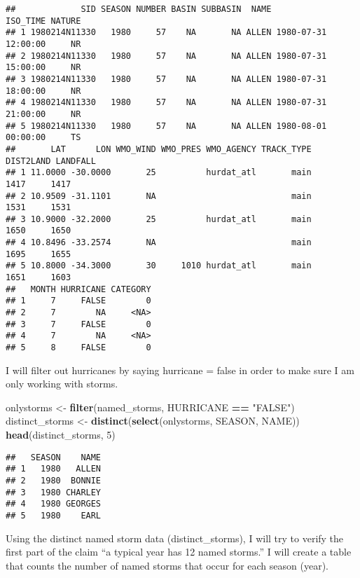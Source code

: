 \documentclass[
]{article}
\newenvironment{Shaded}{\begin{snugshade}}{\end{snugshade}}
\newcommand{\DecValTok}[1]{\textcolor[rgb]{0.00,0.00,0.81}{#1}}
\newcommand{\KeywordTok}[1]{\textcolor[rgb]{0.13,0.29,0.53}{\textbf{#1}}}
\newcommand{\NormalTok}[1]{#1}
\newcommand{\OperatorTok}[1]{\textcolor[rgb]{0.81,0.36,0.00}{\textbf{#1}}}
\newcommand{\StringTok}[1]{\textcolor[rgb]{0.31,0.60,0.02}{#1}}
\begin{document}
\begin{verbatim}
##             SID SEASON NUMBER BASIN SUBBASIN  NAME            ISO_TIME NATURE
## 1 1980214N11330   1980     57    NA       NA ALLEN 1980-07-31 12:00:00     NR
## 2 1980214N11330   1980     57    NA       NA ALLEN 1980-07-31 15:00:00     NR
## 3 1980214N11330   1980     57    NA       NA ALLEN 1980-07-31 18:00:00     NR
## 4 1980214N11330   1980     57    NA       NA ALLEN 1980-07-31 21:00:00     NR
## 5 1980214N11330   1980     57    NA       NA ALLEN 1980-08-01 00:00:00     TS
##       LAT      LON WMO_WIND WMO_PRES WMO_AGENCY TRACK_TYPE DIST2LAND LANDFALL
## 1 11.0000 -30.0000       25          hurdat_atl       main      1417     1417
## 2 10.9509 -31.1101       NA                           main      1531     1531
## 3 10.9000 -32.2000       25          hurdat_atl       main      1650     1650
## 4 10.8496 -33.2574       NA                           main      1695     1655
## 5 10.8000 -34.3000       30     1010 hurdat_atl       main      1651     1603
##   MONTH HURRICANE CATEGORY
## 1     7     FALSE        0
## 2     7        NA     <NA>
## 3     7     FALSE        0
## 4     7        NA     <NA>
## 5     8     FALSE        0
\end{verbatim}

I will filter out hurricanes by saying hurricane = false in order to
make sure I am only working with storms.

\begin{Shaded}
\begin{Highlighting}[]
\NormalTok{onlystorms <-}\StringTok{ }\KeywordTok{filter}\NormalTok{(named_storms, HURRICANE }\OperatorTok{==}\StringTok{ "FALSE"}\NormalTok{)}
\NormalTok{distinct_storms <-}\StringTok{ }\KeywordTok{distinct}\NormalTok{(}\KeywordTok{select}\NormalTok{(onlystorms, SEASON, NAME))}
\KeywordTok{head}\NormalTok{(distinct_storms, }\DecValTok{5}\NormalTok{)}
\end{Highlighting}
\end{Shaded}

\begin{verbatim}
##   SEASON    NAME
## 1   1980   ALLEN
## 2   1980  BONNIE
## 3   1980 CHARLEY
## 4   1980 GEORGES
## 5   1980    EARL
\end{verbatim}

Using the distinct named storm data (distinct\_storms), I will try to
verify the first part of the claim ``a typical year has 12 named
storms.'' I will create a table that counts the number of named storms
that occur for each season (year).
\end{document}
